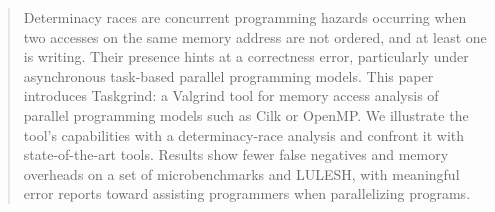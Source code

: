 \begin{abstract}


Determinacy races are concurrent programming hazards occurring when two accesses on the same memory address are not ordered, and at least one is writing.
Their presence hints at a correctness error, particularly under asynchronous task-based parallel programming models.
This paper introduces Taskgrind: a Valgrind tool for memory access analysis of parallel programming models such as Cilk or OpenMP.
We illustrate the tool's capabilities with a determinacy-race analysis and confront it with state-of-the-art tools.
Results show fewer false negatives and memory overheads on a set of microbenchmarks and LULESH, with meaningful error reports toward assisting programmers when parallelizing programs.

\end{abstract}
